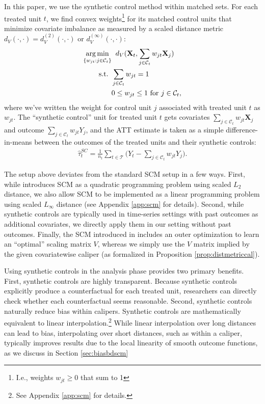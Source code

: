 \documentclass{article}
\newcommand{\Xt}{\mathbf{X}_t}
\newcommand{\Xj}{\mathbf{X}_j}
\newcommand{\Ct}{\mathcal{C}_{t}}
\DeclareMathOperator*{\argmin}{arg\,min}
\begin{document}
In this paper, we use the synthetic control method \citep[SCM; ][]{abadie2010synthetic} within matched sets.
For each treated unit $t$, we find convex weights\footnote{I.e., weights $w_{jt} \geq 0$ that sum to 1} for its matched control units that minimize covariate imbalance as measured by a scaled distance metric $d_V(\cdot, \cdot) = d_V^{(2)}(\cdot, \cdot)$ or $d_V^{(\infty)}(\cdot, \cdot)$:
\begin{align*}
    \argmin_{\{w_{jt} : j \in \Ct\}} 
        &\hspace{2mm} d_V(\Xt, \sum_{j \in \Ct}w_{jt} \Xj) \\
    \text{s.t. } 
        &\sum_{j \in \Ct} w_{jt} = 1 \\
        &0 \leq w_{jt} \leq 1 \text{ for } j \in \mathcal{C}_t,
\end{align*}
where we've written the weight for control unit $j$ associated with treated unit $t$ as $w_{jt}$.
The ``synthetic control'' unit for treated unit $t$ gets covariates $\sum_{j \in \Ct}w_{jt} \Xj$ and outcome $\sum_{j \in \Ct}w_{jt} Y_j$,
and the ATT estimate is taken as a simple difference-in-means between the outcomes of the treated units and their synthetic controls:
\begin{align*}
    \hat{\tau}_t^{SC} = \frac{1}{n_t} \sum_{t \in \mathcal{T}} \big(Y_t - \sum_{j \in \Ct} w_{jt} Y_j \big).
\end{align*}

The setup above deviates from the standard SCM setup in a few ways.
First, while \citet{abadie2010synthetic} introduces SCM as a quadratic programming problem using scaled $L_2$ distance, we also allow SCM to be implemented as a linear programming problem using scaled $L_\infty$ distance (see Appendix \ref{app:scm} for details).
Second, while synthetic controls are typically used in time-series settings with past outcomes as additional covariates, we directly apply them in our setting without past outcomes.
Finally, the SCM introduced in \citet{abadie2010synthetic} includes an outer optimization to learn an ``optimal'' scaling matrix $V$, whereas we simply use the $V$ matrix implied by the given covariatewise caliper (as formalized in Proposition \ref{prop:distmetriccal}).

Using synthetic controls in the analysis phase provides two primary benefits.
First, synthetic controls are highly transparent.
Because synthetic controls explicitly produce a counterfactual for each treated unit, researchers can directly check whether each counterfactual seems reasonable.
Second, synthetic controls naturally reduce bias within calipers.
Synthetic controls are mathematically equivalent to linear interpolation.\footnote{See Appendix \ref{app:scm} for details.}
While linear interpolation over long distances can lead to bias, interpolating over short distances, such as within a caliper, typically improves results due to the local linearity of smooth outcome functions, as we discuss in Section \ref{sec:biasbdscm}
\end{document}
